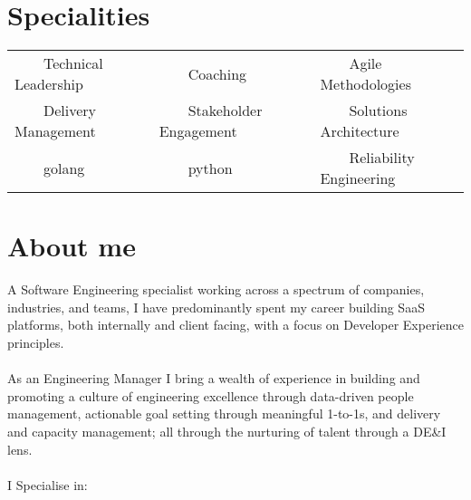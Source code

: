 \documentclass[11pt,a4paper,sans]{article}
\newcommand{\tabitem}{~~\llap{\textbullet}~~}
\begin{document}


\section{Specialities}
\begin{tabular}{lll}
  \tabitem Technical Leadership & \tabitem Coaching & \tabitem Agile Methodologies \\
  \tabitem Delivery Management & \tabitem Stakeholder Engagement & \tabitem Solutions Architecture \\
  \tabitem golang & \tabitem python & \tabitem Reliability Engineering \\

\end{tabular}

\section{About me}
A Software Engineering specialist working across a spectrum of companies, industries, and teams, I have predominantly spent my career building SaaS platforms, both internally and client facing, with a focus on Developer Experience principles. \\
\\
As an Engineering Manager I bring a wealth of experience in building and promoting a culture of engineering excellence through data-driven people management, actionable goal setting through meaningful 1-to-1s, and delivery and capacity management; all through the nurturing of talent through a DE\&I lens.\\
\\
I Specialise in:
\end{document}
